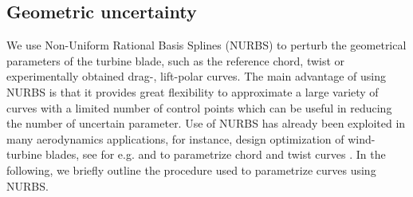 \documentclass[review]{elsarticle}
\numberwithin{equation}{section}
\numberwithin{equation}{section}
\begin{document}
\subsection{Geometric uncertainty}
We use Non-Uniform Rational Basis Splines (NURBS) \cite{rogers2000} to perturb the geometrical parameters of the turbine blade, such as the reference chord, twist or experimentally obtained drag-, lift-polar curves. The main advantage of using NURBS is that it provides great flexibility to approximate a large variety of curves with a limited number of control points which can be useful in reducing the number of uncertain parameter. %
Use of NURBS has already been exploited in many aerodynamics applications, for instance, design optimization of wind-turbine blades, see for e.g. \cite{Ribeiro2012,Bottasso2014} and to parametrize chord and twist curves \cite{Echeverria2017}. In the following, we briefly outline the procedure used to parametrize curves using NURBS.
\end{document}
